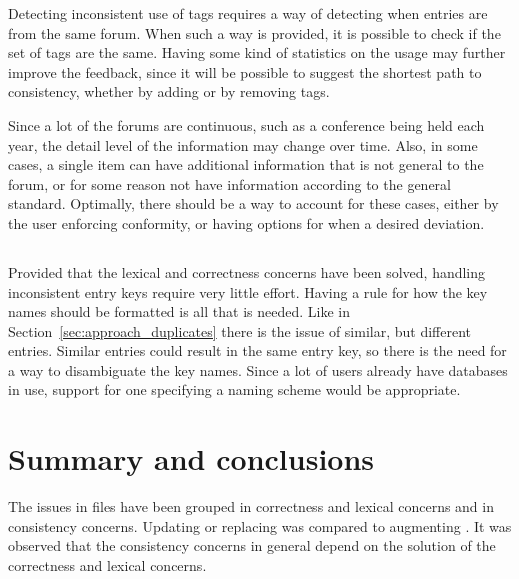 Detecting inconsistent use of tags requires a way of detecting when
entries are from the same forum.  When such a way is provided, it is
possible to check if the set of tags are the same.  Having some kind
of statistics on the usage may further improve the feedback, since it
will be possible to suggest the shortest path to consistency, whether
by adding or by removing tags.

Since a lot of the forums are continuous, such as a conference being
held each year, the detail level of the information may change over
time.  Also, in some cases, a single item can have additional
information that is not general to the forum, or for some reason not
have information according to the general standard.  Optimally, there
should be a way to account for these cases, either by the user
enforcing conformity, or having options for when a desired deviation.


\subsection{}

Provided that the lexical and correctness concerns have been solved,
handling inconsistent entry keys require very little effort.  Having a
rule for how the key names should be formatted is all that is needed.
Like in Section~\ref{sec:approach_duplicates} there is the issue of
similar, but different entries.  Similar entries could result in the
same entry key, so there is the need for a way to disambiguate the key
names.  Since a lot of users already have databases in use, support
for one specifying a naming scheme would be appropriate.


\section{Summary and conclusions}

The issues in {\bibtex} files have been grouped in correctness and
lexical concerns and in consistency concerns.  Updating or replacing
{\bibtex} was compared to augmenting {\bibtex}.  It was observed that
the consistency concerns in general depend on the solution of the
correctness and lexical concerns.

